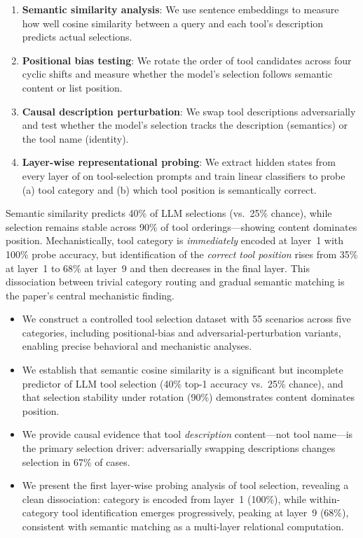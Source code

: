 \begin{enumerate}[leftmargin=*,itemsep=0pt,topsep=2pt]
    \item \textbf{Semantic similarity analysis}: We use \minilm sentence embeddings to
          measure how well cosine similarity between a query and each tool's description
          predicts actual \gptmini selections.
    \item \textbf{Positional bias testing}: We rotate the order of tool candidates across
          four cyclic shifts and measure whether the model's selection follows semantic
          content or list position.
    \item \textbf{Causal description perturbation}: We swap tool descriptions
          adversarially and test whether the model's selection tracks the description
          (semantics) or the tool name (identity).
    \item \textbf{Layer-wise representational probing}: We extract hidden states from
          every layer of \gpttwo on tool-selection prompts and train linear classifiers
          to probe (a) tool category and (b) which tool position is semantically correct.
\end{enumerate}

  Semantic similarity predicts 40\% of LLM selections
(vs.~25\% chance), while selection remains stable across 90\% of tool orderings---showing
content dominates position.  Mechanistically, tool category is \emph{immediately} encoded
at layer~1 with 100\% probe accuracy, but identification of the \emph{correct tool
position} rises from 35\% at layer~1 to 68\% at layer~9 and then decreases in the final
layer.  This dissociation between trivial category routing and gradual semantic matching
is the paper's central mechanistic finding.

\begin{itemize}[leftmargin=*,itemsep=0pt,topsep=0pt]
    \item We construct a controlled tool selection dataset with 55 scenarios across five
          categories, including positional-bias and adversarial-perturbation variants,
          enabling precise behavioral and mechanistic analyses.
    \item We establish that semantic cosine similarity is a significant but incomplete
          predictor of LLM tool selection (40\% top-1 accuracy vs.\ 25\% chance), and
          that selection stability under rotation (90\%) demonstrates content dominates
          position.
    \item We provide causal evidence that tool \emph{description} content---not tool
          name---is the primary selection driver: adversarially swapping descriptions
          changes selection in 67\% of cases.
    \item We present the first layer-wise probing analysis of tool selection, revealing a
          clean dissociation: category is encoded from layer~1 (100\%), while
          within-category tool identification emerges progressively, peaking at layer~9
          (68\%), consistent with semantic matching as a multi-layer relational
          computation.
\end{itemize}

